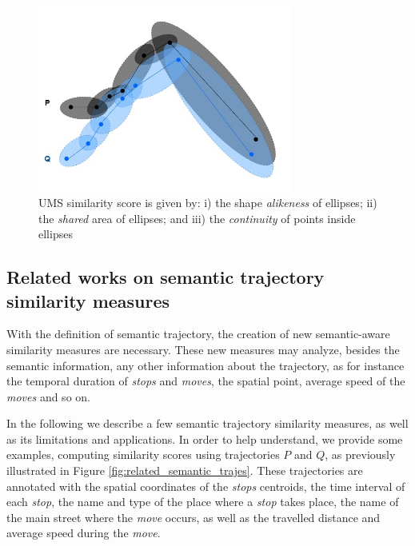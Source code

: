 \begin{figure}[!h]
\centering
\includegraphics[width=0.75\textwidth]{Related_Works/related_trajes-UMS.jpg}
\caption{\label{fig:related_trajes_UMS}UMS similarity score is given by: i) the shape \textit{alikeness} of ellipses; ii) the \textit{shared} area of ellipses; and iii) the \textit{continuity} of points inside ellipses}
\end{figure}

\subsection{Related works on semantic trajectory similarity measures} \label{sec:related_semantic}

With the definition of semantic trajectory, the creation of new semantic-aware similarity measures are necessary. These new measures may analyze, besides the semantic information, any other information about the trajectory, as for instance the temporal duration of \emph{stops} and \emph{moves}, the spatial point, average speed of the \emph{moves} and so on.

In the following we describe a few semantic trajectory similarity measures, as well as its limitations and applications. In order to help understand, we provide some examples, computing similarity scores using trajectories $P$ and $Q$, as previously illustrated in Figure \ref{fig:related_semantic_trajes}. These trajectories are annotated with the spatial coordinates of the \emph{stops} centroids, the time interval of each \emph{stop}, the name and type of the place where a \emph{stop} takes place, the name of the main street where the \emph{move} occurs, as well as the travelled distance and average speed during the \emph{move}.

